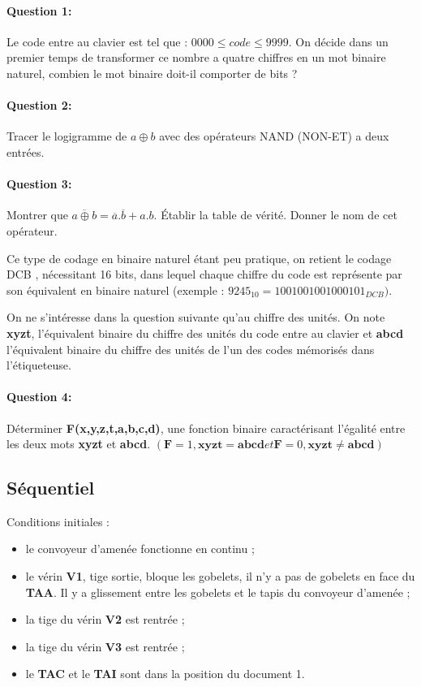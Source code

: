 \paragraph{Question 1:} Le code entre au clavier est tel que : $0000 \leq code \leq 9999$. On décide dans un premier temps de transformer ce nombre a quatre chiffres en un mot binaire naturel, combien le mot binaire doit-il comporter de bits ?

\paragraph{Question 2:} Tracer le logigramme de $a \oplus b$ avec des opérateurs NAND (NON-ET) a deux entrées.

\paragraph{Question 3:} Montrer que $\overline{a \oplus b} = \overline{a}.\overline{b} + a.b$. Établir la table de vérité. Donner le nom de cet opérateur.

Ce type de codage en binaire naturel étant peu pratique, on retient le codage \og DCB \fg, nécessitant 16 bits, dans lequel chaque chiffre du code est représente par son équivalent en binaire naturel (exemple : $9245_{10} = 1001 0010 0100 0101_{DCB})$.

On ne s'intéresse dans la question suivante qu'au chiffre des unités. On note \textbf{xyzt}, l'équivalent binaire du chiffre des unités du code entre au clavier et \textbf{abcd} l'équivalent binaire du chiffre des unités de l'un des codes mémorisés dans l'étiqueteuse.

\paragraph{Question 4:} Déterminer \textbf{F(x,y,z,t,a,b,c,d)}, une fonction binaire caractérisant l'égalité entre les deux mots \textbf{xyzt} et \textbf{abcd}. $(\textbf{F} = 1, \textbf{xyzt} = \textbf{abcd} et \textbf{F} = 0, \textbf{xyzt} \neq \textbf{abcd})$

\subsection{Séquentiel}

Conditions initiales :
\begin{itemize}
 \item le convoyeur d'amenée fonctionne en continu ;
 \item le vérin \textbf{V1}, tige sortie, bloque les gobelets, il n'y a pas de gobelets en face du \textbf{TAA}. Il y a glissement entre les gobelets et le tapis du convoyeur d'amenée ;
 \item la tige du vérin \textbf{V2} est rentrée ;
 \item la tige du vérin \textbf{V3} est rentrée ;
 \item le \textbf{TAC} et le \textbf{TAI} sont dans la position du document 1.
\end{itemize}

